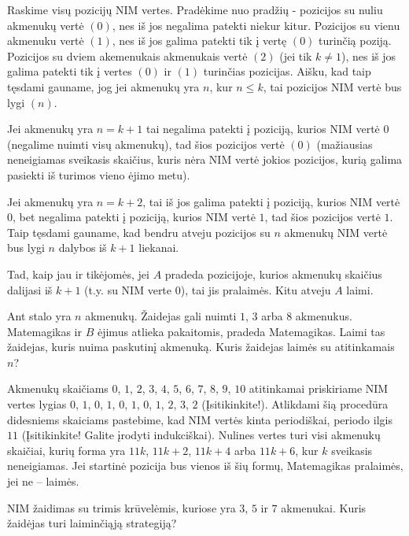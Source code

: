 \begin{sprendimas}
  Raskime visų pozicijų NIM vertes. Pradėkime nuo pradžių - pozicijos su
  nuliu akmenukų vertė $(0)$, nes iš jos negalima patekti niekur kitur.
  Pozicijos su vienu akmenuku vertė $(1)$, nes iš jos galima patekti tik į
  vertę $(0)$ turinčią poziją. Pozicijos su dviem akemenukais akmenukais
  vertė $(2)$ (jei tik $k \neq 1$), nes iš jos galima patekti tik į vertes
  $(0)$ ir $(1)$ turinčias pozicijas. Aišku, kad taip tęsdami gauname, jog
  jei akmenukų yra $n$, kur $n \leq k$, tai pozicijos NIM vertė bus lygi
  $(n)$.

  Jei akmenukų yra $n=k+1$ tai negalima patekti į poziciją, kurios NIM vertė
  $0$ (negalime nuimti visų akmenukų), tad šios pozicijos vertė $(0)$
  (mažiausias neneigiamas sveikasis skaičius, kuris nėra NIM vertė jokios
  pozicijos, kurią galima pasiekti iš turimos vieno ėjimo metu).

  Jei akmenukų yra $n=k+2$, tai iš jos galima patekti į poziciją, kurios NIM
  vertė $0$, bet negalima patekti į poziciją, kurios NIM vertė $1$, tad šios
  pozicijos vertė $1$. Taip tęsdami gauname, kad bendru atveju pozicijos su
  $n$ akmenukų NIM vertė bus lygi $n$ dalybos iš $k+1$ liekanai.

  Tad, kaip jau ir tikėjomės, jei $A$ pradeda pozicijoje, kurios akmenukų
  skaičius dalijasi iš $k+1$ (t.y. su NIM verte $0$), tai jis pralaimės.
  Kitu atveju $A$ laimi.
\end{sprendimas}

\begin{pavnr}
  Ant stalo yra $n$ akmenukų. Žaidejas gali nuimti $1$, $3$ arba $8$ akmenukus.
  Matemagikas ir $B$ ėjimus atlieka pakaitomis, pradeda Matemagikas. Laimi tas
  žaidejas, kuris nuima paskutinį akmenuką. Kuris žaidejas laimės su
  atitinkamais $n$?
\end{pavnr}

Akmenukų skaičiams $0$, $1$, $2$, $3$, $4$, $5$, $6$, $7$, $8$, $9$, $10$
atitinkamai priskiriame NIM vertes lygias $0$, $1$, $0$, $1$, $0$, $1$,
$0$, $1$, $2$, $3$, $2$ (Įsitikinkite!). Atlikdami šią procedūra didesniems
skaiciams pastebime, kad NIM vertės kinta periodiškai, periodo ilgis $11$
(Įsitikinkite! Galite įrodyti indukciškai). Nulines vertes turi visi
akmenukų skaičiai, kurių forma yra $11k$, $11k+2$, $11k+4$ arba $11k+6$,
kur $k$ sveikasis neneigiamas. Jei startinė pozicija bus vienos iš šių
formų, Matemagikas pralaimės, jei ne -- laimės.

\begin{pavnr}
  NIM žaidimas su trimis krūvelėmis, kuriose yra $3$, $5$ ir $7$ akmenukai. Kuris
  žaidėjas turi laiminčiąją strategiją?
\end{pavnr}

